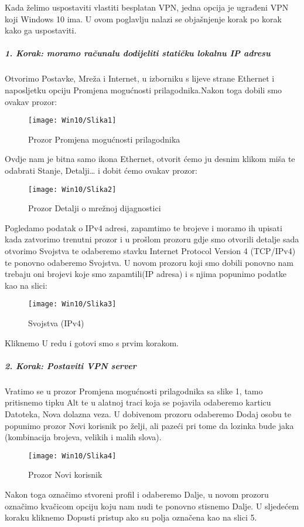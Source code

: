\hfill \smallbreak
Kada želimo uspostaviti vlastiti besplatan VPN, jedna opcija je ugrađeni VPN koji Windows 10 ima. U ovom poglavlju nalazi se objašnjenje korak po korak kako ga uspostaviti.
\smallbreak
\subparagraph{1. Korak:  moramo računalu dodijeliti statičku lokalnu IP adresu}
\hfill \smallbreak
Otvorimo Postavke, Mreža i Internet, u izborniku s lijeve strane Ethernet i naposljetku opciju Promjena mogućnosti prilagodnika.Nakon toga dobili smo ovakav prozor:
\begin{figure}[h!]
	\centering
     \texttt{[image: Win10/Slika1]}
     \caption{Prozor Promjena mogućnosti prilagodnika}
\end{figure}
\FloatBarrier
Ovdje nam je bitna samo ikona Ethernet, otvorit ćemo ju desnim klikom miša te odabrati Stanje, Detalji… i dobit ćemo ovakav prozor:
\begin{figure}[h!]
	\centering
     \texttt{[image: Win10/Slika2]}
     \caption{Prozor Detalji o mrežnoj dijagnostici}
\end{figure}
\FloatBarrier
Pogledamo podatak o IPv4 adresi, zapamtimo te brojeve i moramo ih upisati kada zatvorimo trenutni prozor i u prošlom prozoru gdje smo otvorili detalje sada otvorimo Svojstva te odaberemo stavku Internet Protocol Version 4 (TCP/IPv4) te ponovno odaberemo Svojstva. U novom prozoru koji smo dobili ponovno nam trebaju oni brojevi koje smo zapamtili(IP adresa) i s njima popunimo podatke kao na slici:
\begin{figure}[h!]
	\centering
     \texttt{[image: Win10/Slika3]}
     \caption{Svojstva (IPv4)}
\end{figure}
\FloatBarrier
Kliknemo U redu i gotovi smo s prvim korakom.
\FloatBarrier
\newpage
\subparagraph{2. Korak: Postaviti VPN server}
\hfill \smallbreak
Vratimo se u prozor Promjena mogućnosti prilagodnika sa slike 1, tamo pritisnemo tipku Alt te u alatnoj traci koja se pojavila odaberemo karticu Datoteka, Nova dolazna veza.
U dobivenom prozoru odaberemo Dodaj osobu te popunimo prozor Novi korisnik po želji, ali pazeći pri tome da lozinka bude jaka (kombinacija brojeva, velikih i malih slova).
\FloatBarrier
\begin{figure}[h!]
	\centering
     \texttt{[image: Win10/Slika4]}
     \caption{Prozor Novi korisnik}
\end{figure}
\FloatBarrier
Nakon toga označimo stvoreni profil i odaberemo Dalje, u novom prozoru označimo kvačicom opciju koju nam nudi te ponovno stisnemo Dalje. U sljedećem koraku kliknemo Dopusti pristup ako su polja označena kao na slici 5.
